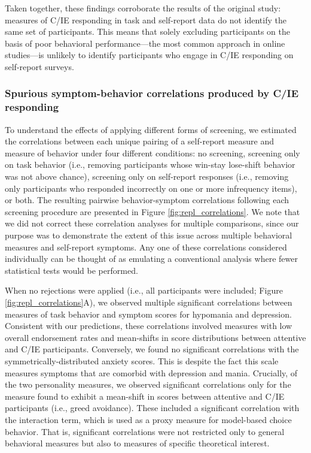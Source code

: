 \documentclass[a4paper,notitlepage,12pt]{article}
\begin{document}
Taken together, these findings corroborate the results of the original study: measures of C/IE responding in task and self-report data do not identify the same set of participants. This means that solely excluding participants on the basis of poor behavioral performance---the most common approach in online studies---is unlikely to identify participants who engage in C/IE responding on self-report surveys. 

\subsubsection*{Spurious symptom-behavior correlations produced by C/IE responding}

To understand the effects of applying different forms of screening, we estimated the correlations between each unique pairing of a self-report measure and measure of behavior under four different conditions: no screening, screening only on task behavior (i.e., removing participants whose win-stay lose-shift behavior was not above chance), screening only on self-report responses (i.e., removing only participants who responded incorrectly on one or more infrequency items), or both. The resulting pairwise behavior-symptom correlations following each screening procedure are presented in Figure \ref{fig:repl_correlations}. We note that we did not correct these correlation analyses for multiple comparisons, since our purpose was to demonstrate the extent of this issue across multiple behavioral measures and self-report symptoms. Any one of these correlations considered individually can be thought of as emulating a conventional analysis where fewer statistical tests would be performed.

When no rejections were applied (i.e., all participants were included; Figure \ref{fig:repl_correlations}A), we observed multiple significant correlations between measures of task behavior and symptom scores for hypomania and depression. Consistent with our predictions, these correlations involved measures with low overall endorsement rates and mean-shifts in score distributions between attentive and C/IE participants. Conversely, we found no significant correlations with the symmetrically-distributed anxiety scores. This is despite the fact this scale measures symptoms that are comorbid with depression and mania. Crucially, of the two personality measures, we observed significant correlations only for the measure found to exhibit a mean-shift in scores between attentive and C/IE participants (i.e., greed avoidance). These included a significant correlation with the interaction term, which is used as a proxy measure for model-based choice behavior. That is, significant correlations were not restricted only to general behavioral measures but also to measures of specific theoretical interest.
\end{document}
